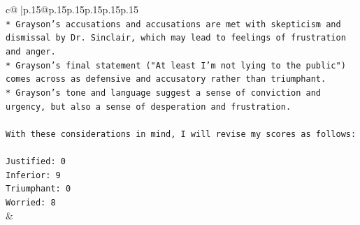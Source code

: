 \documentclass{article}
\begin{document}
{\begin{supertabular}{c@{$\;$}|p{.15\linewidth}@{}p{.15\linewidth}p{.15\linewidth}p{.15\linewidth}p{.15\linewidth}p{.15\linewidth}}
{{{\\ 
\texttt{* Grayson's accusations and accusations are met with skepticism and dismissal by Dr. Sinclair, which may lead to feelings of frustration and anger.} \\
\texttt{* Grayson's final statement ("At least I'm not lying to the public") comes across as defensive and accusatory rather than triumphant.} \\
\texttt{* Grayson's tone and language suggest a sense of conviction and urgency, but also a sense of desperation and frustration.} \\
\\ 
\texttt{With these considerations in mind, I will revise my scores as follows:} \\
\\ 
\texttt{Justified: 0} \\
\texttt{Inferior: 9} \\
\texttt{Triumphant: 0} \\
\texttt{Worried: 8} \\
            }
        }
    }
    & \\ \\

\end{supertabular}
}
\end{document}

